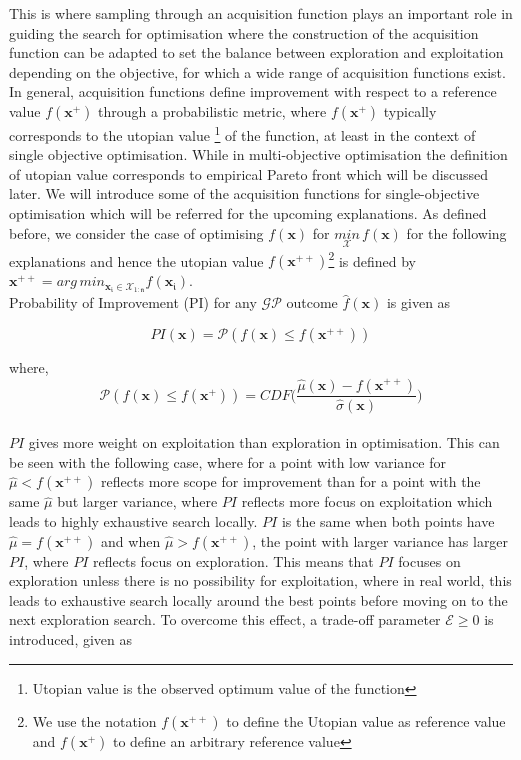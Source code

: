  This is where sampling through an acquisition function plays an important role in guiding the search for optimisation where the construction of the acquisition function can be adapted to set the balance between exploration and exploitation depending on the objective, for which a wide range of acquisition functions exist. 
 In general, acquisition functions define improvement with respect to a reference value $f(\bm{x}^+)$ through a probabilistic metric, where $f(\bm{x}^+)$ typically corresponds to the utopian value \footnote{Utopian value is the observed optimum value of the function} of the function, at least in the context of single objective optimisation. 
 While in multi-objective optimisation the definition of utopian value corresponds to empirical Pareto front which will be discussed later. 
 We will introduce some of the acquisition functions for single-objective optimisation which will be referred for the upcoming explanations. As defined before, we consider the case of optimising $f(\bm{x})$ for $\underset{\mathcal{X}}{min}\,f(\bm{x})$ for the following explanations and hence the utopian value  $f(\bm{x}^{++})$\footnote{We use the notation $f(\bm{x}^{++})$ to define the Utopian value as reference value and $f(\bm{x}^{+})$ to define an arbitrary reference value} is defined by ${\bm x}^{++}=arg \, min_{\bm{x}_{\mathfrak i}\in\mathcal{X}_{1:\mathfrak{n}}} f(\bm x_{\mathfrak{i}})$.\\
 
  
 Probability of Improvement (PI) for any  $\mathcal{GP}$ outcome $\hat{f}(\bm x)$ is given as 
 
 \begin{equation}
 PI(\bm x) = \mathcal{P}({f}(\bm x)\leq f(\bm{x}^{++}))
 \end{equation}
 
 where,\\  
 
 \begin{equation}
 \mathcal{P}({f}(\bm x)\leq f(\bm{x}^+))=CDF\bigg(\frac{\hat{\mu}(\bm x)-f(\bm{x}^{++})}{\hat{\sigma}(\bm x)}\bigg)
 \end{equation}\\

$PI$ gives more weight on exploitation than exploration in optimisation. This can be seen with the following case, where for a point with low variance for $\hat{\mu}<f(\bm{x}^{++})$ reflects more scope for improvement than for a point with the same $\hat{\mu}$ but larger variance, where $PI$ reflects more focus on exploitation which leads to highly exhaustive search locally. $PI$ is the same when both  points have $\hat{\mu}=f(\bm{x}^{++})$ and when $\hat{\mu}>f(\bm{x}^{++})$, the point with larger variance has larger $PI$, where $PI$ reflects focus on exploration. This means that $PI$ focuses on exploration unless there is no possibility for exploitation, where in real world, this leads to exhaustive search locally around the best points before moving on to the next exploration search. To overcome this effect, a trade-off parameter $\mathscr{E}\geq 0$ is introduced, given as

